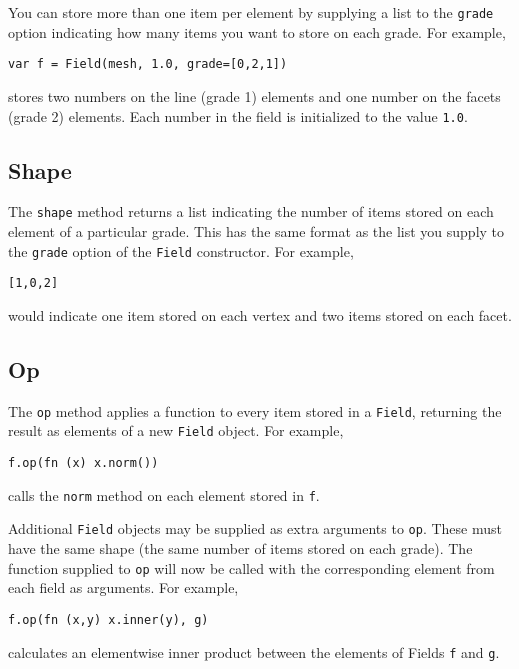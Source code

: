 You can store more than one item per element by supplying a list to the
\texttt{grade} option indicating how many items you want to store on
each grade. For example,

\begin{lstlisting}
var f = Field(mesh, 1.0, grade=[0,2,1])
\end{lstlisting}

stores two numbers on the line (grade 1) elements and one number on the
facets (grade 2) elements. Each number in the field is initialized to
the value \texttt{1.0}.

\hypertarget{shape}{%
\subsection{Shape}\label{shape}}

The \texttt{shape} method returns a list indicating the number of items
stored on each element of a particular grade. This has the same format
as the list you supply to the \texttt{grade} option of the
\texttt{Field} constructor. For example,

\begin{lstlisting}
[1,0,2]
\end{lstlisting}

would indicate one item stored on each vertex and two items stored on
each facet.

\hypertarget{op}{%
\subsection{Op}\label{op}}

The \texttt{op} method applies a function to every item stored in a
\texttt{Field}, returning the result as elements of a new \texttt{Field}
object. For example,

\begin{lstlisting}
f.op(fn (x) x.norm())
\end{lstlisting}

calls the \texttt{norm} method on each element stored in \texttt{f}.

Additional \texttt{Field} objects may be supplied as extra arguments to
\texttt{op}. These must have the same shape (the same number of items
stored on each grade). The function supplied to \texttt{op} will now be
called with the corresponding element from each field as arguments. For
example,

\begin{lstlisting}
f.op(fn (x,y) x.inner(y), g)
\end{lstlisting}

calculates an elementwise inner product between the elements of Fields
\texttt{f} and \texttt{g}.
